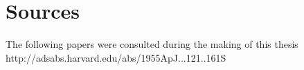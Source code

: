 \documentclass[a4paper,10pt]{article}
\date{11/21/14}
\begin{document}
 \section{Sources}
 The following papers were consulted during the making of this thesis
 http://adsabs.harvard.edu/abs/1955ApJ...121..161S
\end{document}
